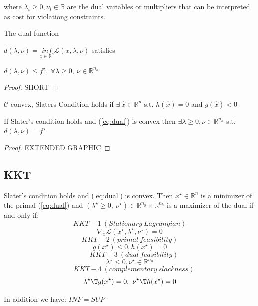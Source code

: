 where $\lambda_i \ge 0, \nu_i \in \mathbb{R}$ are the dual variables or multipliers
that can be interpreted as cost for violationg constraints.

\begin{proposition}
	The  dual function

	$d(\lambda,\nu) = \underset{x \in \mathcal{\mathbb{R}}^n}{inf}\mathcal{L}(x,\lambda,\nu)$ satisfies

	$d(\lambda,\nu)\le f^\star,\ \forall \lambda\ge 0,\ \nu \in \mathbb{R}^{n_h}$

\end{proposition}

\begin{proof}
	SHORT %
\end{proof}

\begin{definition}
	$\mathcal{C}$ convex, Slaters Condition holds if
	$\exists\ \hat{x} \in \mathbb{R}^{n}$ s.t. $h(\hat{x})=0$ and $g(\hat{x})<0$
\end{definition}

\begin{proposition}
	If Slater's condition holds and (\ref{eq:dual}) is convex then
	$\exists \lambda \ge 0, \nu \in \mathbb{R}^{n_h}$ s.t. $d(\lambda,\nu)=f^\star$
\end{proposition}

\begin{proof}
	EXTENDED %
	GRAPHIC
\end{proof}

\subsection{KKT}

\begin{theorem}
	Slater's condition holds and (\ref{eq:dual}) is convex.
	Then $x^\star \in \mathbb{R}^{n}$ is a minimizer of the primal (\ref{eq:dual})
	and $(\lambda^\star \ge 0,\ \nu^\star) \in \mathbb{R}^{n_g} \times \mathbb{R}^{n_h}$ is a maximizer of the dual
	if and only if: %
	$$ KKT-1\ (Stationary\ Lagrangian)                                         $$
	$$ \nabla_x\mathcal{L}(x^\star,\lambda^\star,\nu^\star)=0                 $$
	$$ KKT-2\ (primal\ feasibility)                                           $$
	$$ g(x^\star)\le0, h(x^\star)=0                                           $$
	$$ \quad\ KKT-3\ (dual\ feasibility)                                      $$
	$$ \lambda^\star\le0, \nu^\star \in \mathbb{R}^{n_h}                      $$
	$$ \quad\ KKT-4\ (complementary\ slackness)                               $$
	$$ {\lambda^\star}\T g(x^\star)=0,\ {\nu^\star}\T h(x^\star)=0     $$

	In addition we have:
	$INF=SUP$ %

\end{theorem}

